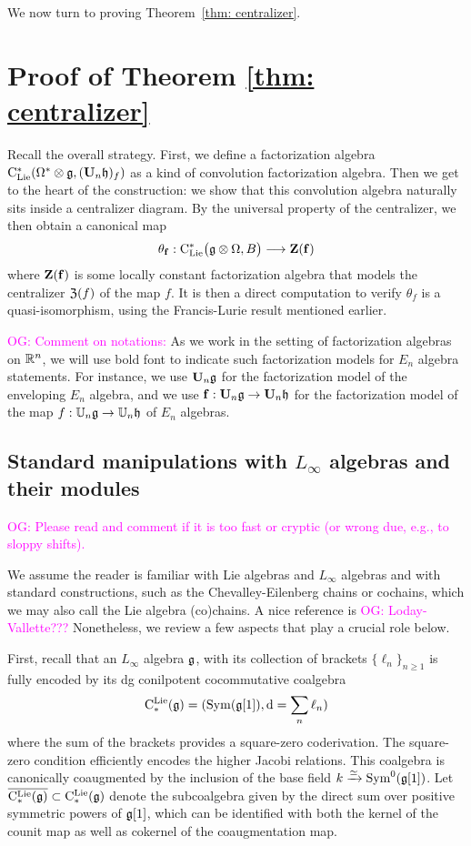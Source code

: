 \documentclass[11pt]{amsart}
\numberwithin{equation}{section}
\def\owen{\textcolor{magenta}{OG: }\textcolor{magenta}}
\begin{document}
We now turn to proving Theorem~\ref{thm: centralizer}.

\section{Proof of Theorem \ref{thm: centralizer}}

Recall the overall strategy.
First, we define a factorization algebra ${\rm C}_{\rm Lie}^*(\Omega^* \otimes \mathfrak g, (\mathbf U_n \mathfrak h)_f)$ as a kind of convolution factorization algebra.
Then we get to the heart of the construction:
we show that this convolution algebra naturally sits inside a centralizer diagram.
By the universal property of the centralizer, we then obtain 
a canonical map 
\[
\theta_{{\bf f}}: {\rm C}_{\rm Lie}^*\big(\mathfrak g\otimes \Omega , B \big) \longrightarrow  \mathbf Z(\mathbf{f})
\]
where $\mathbf Z(\mathbf{f})$ is some locally constant factorization algebra that models the centralizer ${\frak Z}(f)$ of the map $f$.
It is then a direct computation to verify $\theta_f$ is a quasi-isomorphism,
using the Francis-Lurie result mentioned earlier.

\owen{Comment on notations:}
As we work in the setting of factorization algebras on $\mathbb R^n$, 
we will use bold font to indicate such factorization models for $E_n$ algebra statements.
For instance, we use $\mathbf U_n \mathfrak g$ for the factorization model of the enveloping $E_n$ algebra,
and we use ${\bf f}: \mathbf U_n \mathfrak g \to \mathbf U_n \mathfrak h$ for the factorization model of the map $f: \mathbb U_n \mathfrak g \to \mathbb U_n \mathfrak h$ of $E_n$ algebras.

\subsection{Standard manipulations with $L_\infty$ algebras and their modules}

\owen{Please read and comment if it is too fast or cryptic (or wrong due, e.g., to sloppy shifts).}

We assume the reader is familiar with Lie algebras and $L_\infty$ algebras and with standard constructions,
such as the Chevalley-Eilenberg chains or cochains, which we may also call the Lie algebra (co)chains.
A nice reference is \owen{Loday-Vallette???}
Nonetheless, we review a few aspects that play a crucial role below.

First, recall that an $L_\infty$ algebra $\mathfrak g$, with its collection of brackets $\{\ell_n\}_{n \geq 1}$ is fully encoded by its dg conilpotent cocommutative coalgebra
\[
{\rm C}^{\rm Lie}_*(\mathfrak g) = ({\rm Sym}(\mathfrak g[1]), {\rm d} = \sum_n \ell_n)
\]
where the sum of the brackets provides a square-zero coderivation.
The square-zero condition efficiently encodes the higher Jacobi relations.
This coalgebra is canonically coaugmented by the inclusion of the base field $k \xrightarrow{\simeq} {\rm Sym}^0(\mathfrak g[1])$.
Let $\overline{{\rm C}^{\rm Lie}_*(\mathfrak g)} \subset {\rm C}^{\rm Lie}_*(\mathfrak g)$ denote the subcoalgebra given by the direct sum over positive symmetric powers of $\mathfrak g[1]$,
which can be identified with both the kernel of the counit map as well as cokernel of the coaugmentation map.
\end{document}
